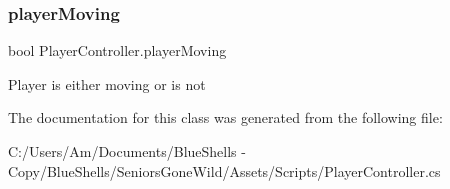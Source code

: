 \subsubsection{\texorpdfstring{player\+Moving}{playerMoving}}
{\footnotesize\ttfamily bool Player\+Controller.\+player\+Moving\hspace{0.3cm}{\ttfamily [private]}}



Player is either moving or is not 



The documentation for this class was generated from the following file\+:\begin{DoxyCompactItemize}
\item 
C\+:/\+Users/\+Am/\+Documents/\+Blue\+Shells -\/ Copy/\+Blue\+Shells/\+Seniors\+Gone\+Wild/\+Assets/\+Scripts/Player\+Controller.\+cs\end{DoxyCompactItemize}

